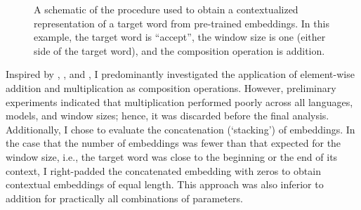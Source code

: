 \begin{figure}
  \centering
  \newcommand{\period}{\text{.}}
  \newcommand*{\orawidest}{accept}
  \newcommand*{\oratallest}{\#\#}
  \newlength{\orawidth}
  \settowidth{\orawidth}{\orawidest}
  \newcommand*{\ora}[1]{\overrightarrow{#1\vphantom{\oratallest}}}
  \caption{A schematic of the procedure used
    to obtain a contextualized representation of a target word from pre-trained embeddings.
    In this example, the target word is ``accept'', the window size is one (either side of
    the target word), and the composition operation is addition.
  }
  \label{chart:schematic-procedure}
\end{figure}

Inspired by \textcite{Landauer1997}, \textcite{Kintsch2001}, and
\textcite{Mitchell2008}, I predominantly investigated the application of element-wise
addition and multiplication as composition operations.
However, preliminary experiments indicated that multiplication performed poorly across
all languages, models, and window sizes; hence, it was discarded before the final
analysis.
Additionally, I chose to evaluate the concatenation (`stacking') of embeddings.
In the case that the number of embeddings was fewer than that expected for the window
size, i.e., the target word was close to the beginning or the end of its context, I
right-padded the concatenated embedding with zeros to obtain contextual embeddings of
equal length.
This approach was also inferior to addition for practically all combinations of
parameters.

